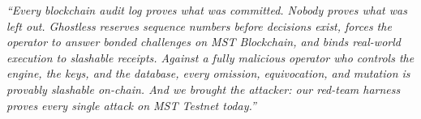 \documentclass[11pt,a4paper]{article}
\begin{document}
\begin{tcolorbox}[colframe=accentgreen, title=\textbf{The 30-Second Winning Pitch to Judges}]
\textit{``Every blockchain audit log proves what was committed. Nobody proves what was left out. Ghostless reserves sequence numbers before decisions exist, forces the operator to answer bonded challenges on MST Blockchain, and binds real-world execution to slashable receipts. Against a fully malicious operator who controls the engine, the keys, and the database, every omission, equivocation, and mutation is provably slashable on-chain. And we brought the attacker: our red-team harness proves every single attack on MST Testnet today.''}
\end{tcolorbox}
\end{document}
